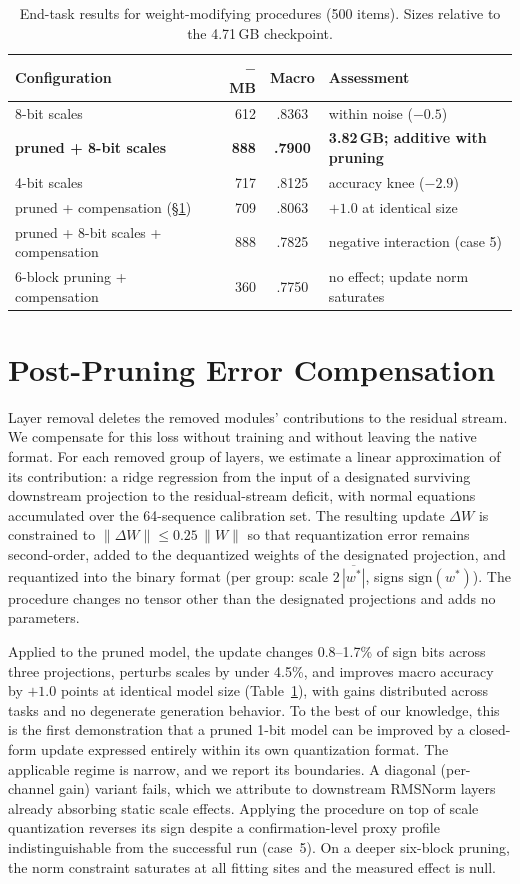 \documentclass[10pt]{article}
\begin{document}
\begin{table}[h]
\centering\small
\begin{tabular}{lrcl}
\toprule
Configuration & $-$MB & Macro & Assessment \\
\midrule
8-bit scales & 612 & .8363 & within noise ($-0.5$) \\
\textbf{pruned + 8-bit scales} & \textbf{888} & \textbf{.7900} & \textbf{3.82\,GB; additive with pruning} \\
4-bit scales & 717 & .8125 & accuracy knee ($-2.9$) \\
\midrule
pruned + compensation (\S\ref{sec:repair}) & 709 & .8063 & $+1.0$ at identical size \\
pruned + 8-bit scales + compensation & 888 & .7825 & negative interaction (case 5) \\
6-block pruning + compensation & 360 & .7750 & no effect; update norm saturates \\
\bottomrule
\end{tabular}
\caption{End-task results for weight-modifying procedures (500 items). Sizes relative to the 4.71\,GB checkpoint.}
\label{tab:flagged}
\end{table}

\section{Post-Pruning Error Compensation}
\label{sec:repair}
Layer removal deletes the removed modules' contributions to the residual stream. We compensate for this loss without training and without leaving the native format. For each removed group of layers, we estimate a linear approximation of its contribution: a ridge regression from the input of a designated surviving downstream projection to the residual-stream deficit, with normal equations accumulated over the 64-sequence calibration set. The resulting update $\Delta W$ is constrained to $\lVert\Delta W\rVert \le 0.25\,\lVert W\rVert$ so that requantization error remains second-order, added to the dequantized weights of the designated projection, and requantized into the binary format (per group: scale $2\,\overline{|w^*|}$, signs $\mathrm{sign}(w^*)$). The procedure changes no tensor other than the designated projections and adds no parameters.

Applied to the pruned model, the update changes 0.8--1.7\% of sign bits across three projections, perturbs scales by under 4.5\%, and improves macro accuracy by $+1.0$ points at identical model size (Table~\ref{tab:flagged}), with gains distributed across tasks and no degenerate generation behavior. To the best of our knowledge, this is the first demonstration that a pruned 1-bit model can be improved by a closed-form update expressed entirely within its own quantization format. The applicable regime is narrow, and we report its boundaries. A diagonal (per-channel gain) variant fails, which we attribute to downstream RMSNorm layers already absorbing static scale effects. Applying the procedure on top of scale quantization reverses its sign despite a confirmation-level proxy profile indistinguishable from the successful run (case~5). On a deeper six-block pruning, the norm constraint saturates at all fitting sites and the measured effect is null.
\end{document}
